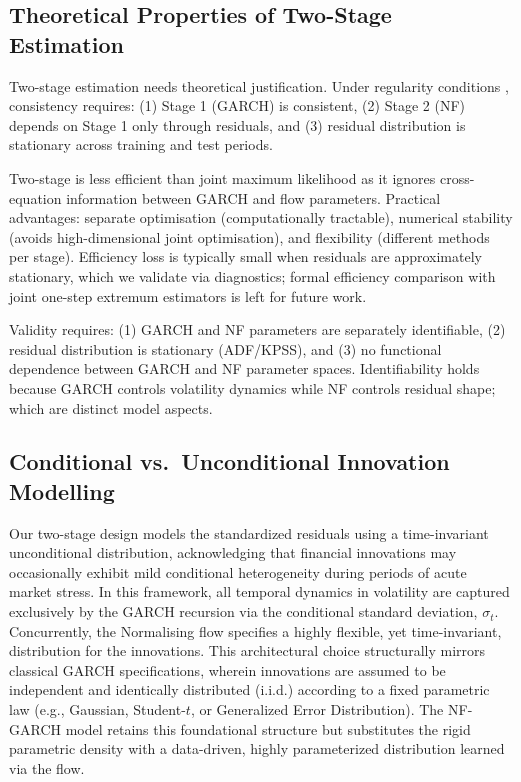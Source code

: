 \documentclass[risks,article,submit,pdftex,moreauthors]{Definitions/mdpi}
\begin{document}
\subsection{Theoretical Properties of Two-Stage Estimation}
\label{subsec:two_stage_theory}

Two-stage estimation needs theoretical justification. Under regularity conditions \citep{newey1994large}, consistency requires: (1) Stage 1 (GARCH) is consistent, (2) Stage 2 (NF) depends on Stage 1 only through residuals, and (3) residual distribution is stationary across training and test periods.

Two-stage is less efficient than joint maximum likelihood as it ignores cross-equation information between GARCH and flow parameters. Practical advantages: separate optimisation (computationally tractable), numerical stability (avoids high-dimensional joint optimisation), and flexibility (different methods per stage). Efficiency loss is typically small when residuals are approximately stationary, which we validate via diagnostics; formal efficiency comparison with joint one-step extremum estimators is left for future work.

Validity requires: (1) GARCH and NF parameters are separately identifiable, (2) residual distribution is stationary (ADF/KPSS), and (3) no functional dependence between GARCH and NF parameter spaces. Identifiability holds because GARCH controls volatility dynamics while NF controls residual shape; which are distinct model aspects.

\subsection{Conditional vs.\ Unconditional Innovation Modelling}
\label{subsec:conditional_vs_unconditional}
Our two-stage design models the standardized residuals using a time-invariant unconditional distribution, acknowledging that financial innovations may occasionally exhibit mild conditional heterogeneity during periods of acute market stress. In this framework, all temporal dynamics in volatility are captured exclusively by the GARCH recursion via the conditional standard deviation, $\sigma_t$. Concurrently, the Normalising flow specifies a highly flexible, yet time-invariant, distribution for the innovations. This architectural choice structurally mirrors classical GARCH specifications, wherein innovations are assumed to be independent and identically distributed (i.i.d.) according to a fixed parametric law (e.g., Gaussian, Student-$t$, or Generalized Error Distribution). The NF-GARCH model retains this foundational structure but substitutes the rigid parametric density with a data-driven, highly parameterized distribution learned via the flow. 
\end{document}
